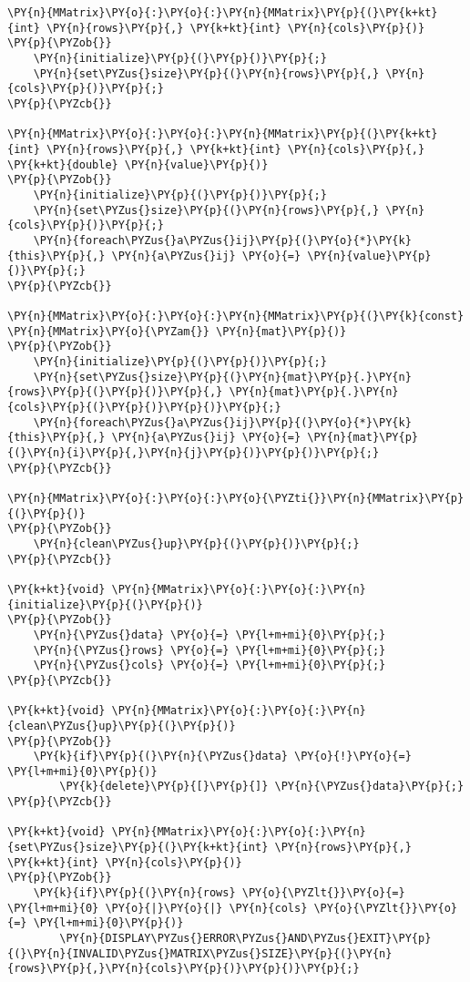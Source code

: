 \begin{Verbatim}[commandchars=\\\{\}]
\PY{n}{MMatrix}\PY{o}{:}\PY{o}{:}\PY{n}{MMatrix}\PY{p}{(}\PY{k+kt}{int} \PY{n}{rows}\PY{p}{,} \PY{k+kt}{int} \PY{n}{cols}\PY{p}{)}
\PY{p}{\PYZob{}}
	\PY{n}{initialize}\PY{p}{(}\PY{p}{)}\PY{p}{;}
	\PY{n}{set\PYZus{}size}\PY{p}{(}\PY{n}{rows}\PY{p}{,} \PY{n}{cols}\PY{p}{)}\PY{p}{;}
\PY{p}{\PYZcb{}}

\PY{n}{MMatrix}\PY{o}{:}\PY{o}{:}\PY{n}{MMatrix}\PY{p}{(}\PY{k+kt}{int} \PY{n}{rows}\PY{p}{,} \PY{k+kt}{int} \PY{n}{cols}\PY{p}{,} \PY{k+kt}{double} \PY{n}{value}\PY{p}{)}
\PY{p}{\PYZob{}}
	\PY{n}{initialize}\PY{p}{(}\PY{p}{)}\PY{p}{;}
	\PY{n}{set\PYZus{}size}\PY{p}{(}\PY{n}{rows}\PY{p}{,} \PY{n}{cols}\PY{p}{)}\PY{p}{;}
	\PY{n}{foreach\PYZus{}a\PYZus{}ij}\PY{p}{(}\PY{o}{*}\PY{k}{this}\PY{p}{,} \PY{n}{a\PYZus{}ij} \PY{o}{=} \PY{n}{value}\PY{p}{)}\PY{p}{;}
\PY{p}{\PYZcb{}}

\PY{n}{MMatrix}\PY{o}{:}\PY{o}{:}\PY{n}{MMatrix}\PY{p}{(}\PY{k}{const} \PY{n}{MMatrix}\PY{o}{\PYZam{}} \PY{n}{mat}\PY{p}{)}
\PY{p}{\PYZob{}}
	\PY{n}{initialize}\PY{p}{(}\PY{p}{)}\PY{p}{;}
	\PY{n}{set\PYZus{}size}\PY{p}{(}\PY{n}{mat}\PY{p}{.}\PY{n}{rows}\PY{p}{(}\PY{p}{)}\PY{p}{,} \PY{n}{mat}\PY{p}{.}\PY{n}{cols}\PY{p}{(}\PY{p}{)}\PY{p}{)}\PY{p}{;}
	\PY{n}{foreach\PYZus{}a\PYZus{}ij}\PY{p}{(}\PY{o}{*}\PY{k}{this}\PY{p}{,} \PY{n}{a\PYZus{}ij} \PY{o}{=} \PY{n}{mat}\PY{p}{(}\PY{n}{i}\PY{p}{,}\PY{n}{j}\PY{p}{)}\PY{p}{)}\PY{p}{;}
\PY{p}{\PYZcb{}}

\PY{n}{MMatrix}\PY{o}{:}\PY{o}{:}\PY{o}{\PYZti{}}\PY{n}{MMatrix}\PY{p}{(}\PY{p}{)}
\PY{p}{\PYZob{}}
	\PY{n}{clean\PYZus{}up}\PY{p}{(}\PY{p}{)}\PY{p}{;}
\PY{p}{\PYZcb{}}

\PY{k+kt}{void} \PY{n}{MMatrix}\PY{o}{:}\PY{o}{:}\PY{n}{initialize}\PY{p}{(}\PY{p}{)}
\PY{p}{\PYZob{}}
	\PY{n}{\PYZus{}data} \PY{o}{=} \PY{l+m+mi}{0}\PY{p}{;}
	\PY{n}{\PYZus{}rows} \PY{o}{=} \PY{l+m+mi}{0}\PY{p}{;}
	\PY{n}{\PYZus{}cols} \PY{o}{=} \PY{l+m+mi}{0}\PY{p}{;}
\PY{p}{\PYZcb{}}

\PY{k+kt}{void} \PY{n}{MMatrix}\PY{o}{:}\PY{o}{:}\PY{n}{clean\PYZus{}up}\PY{p}{(}\PY{p}{)}
\PY{p}{\PYZob{}}
	\PY{k}{if}\PY{p}{(}\PY{n}{\PYZus{}data} \PY{o}{!}\PY{o}{=} \PY{l+m+mi}{0}\PY{p}{)}
		\PY{k}{delete}\PY{p}{[}\PY{p}{]} \PY{n}{\PYZus{}data}\PY{p}{;}
\PY{p}{\PYZcb{}}

\PY{k+kt}{void} \PY{n}{MMatrix}\PY{o}{:}\PY{o}{:}\PY{n}{set\PYZus{}size}\PY{p}{(}\PY{k+kt}{int} \PY{n}{rows}\PY{p}{,} \PY{k+kt}{int} \PY{n}{cols}\PY{p}{)}
\PY{p}{\PYZob{}}
	\PY{k}{if}\PY{p}{(}\PY{n}{rows} \PY{o}{\PYZlt{}}\PY{o}{=} \PY{l+m+mi}{0} \PY{o}{|}\PY{o}{|} \PY{n}{cols} \PY{o}{\PYZlt{}}\PY{o}{=} \PY{l+m+mi}{0}\PY{p}{)}
		\PY{n}{DISPLAY\PYZus{}ERROR\PYZus{}AND\PYZus{}EXIT}\PY{p}{(}\PY{n}{INVALID\PYZus{}MATRIX\PYZus{}SIZE}\PY{p}{(}\PY{n}{rows}\PY{p}{,}\PY{n}{cols}\PY{p}{)}\PY{p}{)}\PY{p}{;}


\end{Verbatim}
